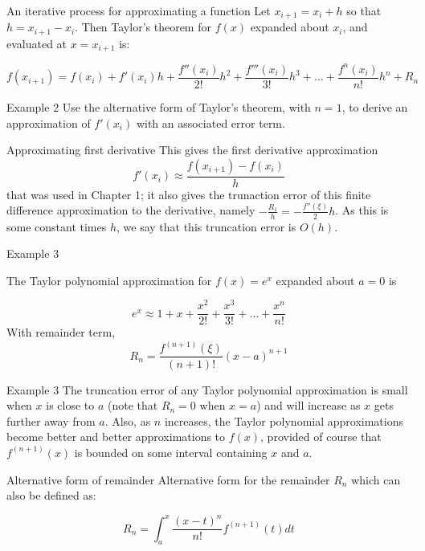 \documentclass[12pt]{beamer}
\begin{document}
\begin{frame}{An iterative process for approximating a function} 
Let $x_{i+1} = x_{i} + h$ so that $h = x_{i+1} - x_{i}$. Then Taylor's theorem for $f(x)$ expanded about $x_{i}$, and evaluated at $x=x_{i+1}$ is: 

\[ 
f(x_{i+1}) = f(x_i) + f'(x_i) h + \frac{f''(x_i)}{2!}h^2 + \frac{f'''(x_i)}{3!}h^3 + \dots + \frac{f^{n}(x_i)}{n!}h^n + R_{n}  
\] 

\end{frame} 

\begin{frame}{Example 2}
Use the alternative form of Taylor's theorem, with $n=1$, to derive an approximation of $f'(x_i)$ with an associated error term.
\vspace{3 in}
\end{frame}

\begin{frame}{Approximating first derivative}
This gives the first derivative approximation
\[
f'(x_i) \approx \frac{f(x_{i+1})-f(x_i)}{h}
\] 
\noindent 
that was used in Chapter 1; it also gives the trunaction error of this finite difference approximation to the derivative, namely $-\frac{R_1}{h} = -\frac{f''(\xi)}{2}h$. As this is some constant times $h$, we say that this truncation error is $O(h)$. 

\end{frame} 


\begin{frame}{Example 3} 

The Taylor polynomial approximation for $f(x) = e^x$ expanded about $a=0$ is 

\[ 
e^x \approx 1 + x + \frac{x^2}{2!} + \frac{x^3}{3!} + \dots + \frac{x^n}{n!} 
\]
\noindent 
With remainder term, 
\[
R_n = \frac{f^{(n+1)} (\xi)}{(n+1)!}(x-a)^{n+1} 
\]
\end{frame} 

\begin{frame}{Example 3} 
The truncation error of any Taylor polynomial approximation is small when $x$ is close to $a$ (note that $R_n=0$ when $x=a$) and will increase as $x$ gets further away from $a$. Also, as $n$ increases, the Taylor polynomial approximations become better and better approximations to $f(x)$, provided of course that $f^{(n+1)}(x)$ is bounded on some interval containing $x$ and $a$. 

\end{frame} 

\begin{frame}{Alternative form of remainder}
Alternative form for the remainder $R_n$ which can also be
defined as: 

\begin{equation} 
R_n = \int^{x}_{a} \frac{(x-t)^n}{n!} f^{(n+1)}(t)dt 
\end{equation} 
\end{frame} 
\end{document}
